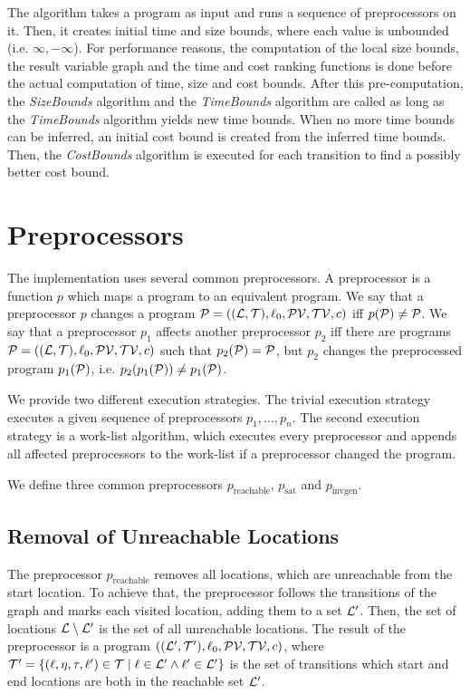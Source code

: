 The algorithm takes a program as input and runs a sequence of preprocessors on it.
Then, it creates initial time and size bounds, where each value is unbounded (i.e. $\infty, -\infty$).
For performance reasons, the computation of the local size bounds, the result variable graph and the time and cost ranking functions is done before the actual computation of time, size and cost bounds.
After this pre-computation, the \emph{SizeBounds} algorithm and the \emph{TimeBounds} algorithm are called as long as the \emph{TimeBounds} algorithm yields new time bounds.
When no more time bounds can be inferred, an initial cost bound is created from the inferred time bounds.
Then, the \emph{CostBounds} algorithm is executed for each transition to find a possibly better cost bound.

\section{Preprocessors}

The implementation uses several common preprocessors.
A preprocessor is a function $p$ which maps a program to an equivalent program.
We say that a preprocessor $p$ changes a program $\mathcal{P} = ((\mathcal{L}, \mathcal{T}), \ell_0, \mathcal{PV}, \mathcal{TV}, c)$ iff $p(\mathcal{P}) \neq \mathcal{P}$.
We say that a preprocessor $p_1$ affects another preprocessor $p_2$ iff there are programs $\mathcal{P} = ((\mathcal{L}, \mathcal{T}), \ell_0, \mathcal{PV}, \mathcal{TV}, c)$ such that $p_2(\mathcal{P}) = \mathcal{P}$, but $p_2$ changes the preprocessed program $p_1(\mathcal{P})$, i.e. $p_2(p_1(\mathcal{P})) \neq p_1(\mathcal{P})$.

We provide two different execution strategies.
The trivial execution strategy executes a given sequence of preprocessors $p_1, \dots, p_n$.
The second execution strategy is a work-list algorithm, which executes every preprocessor and appends all affected preprocessors to the work-list if a preprocessor changed the program.

We define three common preprocessors $p_{\text{reachable}}$, $p_{\text{sat}}$ and $p_{\text{invgen}}$.

\subsection{Removal of Unreachable Locations}

The preprocessor $p_{\text{reachable}}$ removes all locations, which are unreachable from the start location.
To achieve that, the preprocessor follows the transitions of the graph and marks each visited location, adding them to a set $\mathcal{L}'$.
Then, the set of locations $\mathcal{L} \setminus \mathcal{L}'$ is the set of all unreachable locations.
The result of the preprocessor is a program $((\mathcal{L}', \mathcal{T}'), \ell_0, \mathcal{PV}, \mathcal{TV}, c)$, where $\mathcal{T}' = \lbrace (\ell,\eta,\tau,\ell') \in \mathcal{T} \mid \ell \in \mathcal{L}' \wedge \ell' \in \mathcal{L}' \rbrace$ is the set of transitions which start and end locations are both in the reachable set $\mathcal{L}'$.


